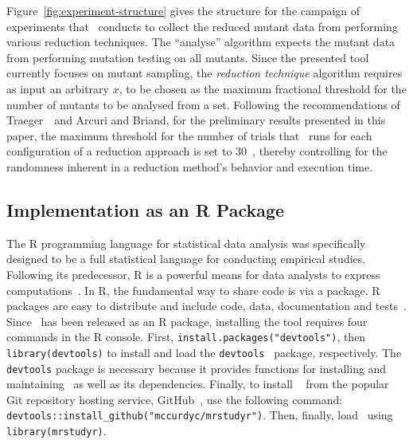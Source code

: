 Figure~\ref{fig:experiment-structure} gives the structure for the campaign of experiments that \mr~conducts to collect
the reduced mutant data from performing various reduction techniques. The ``analyse'' algorithm expects the mutant data from performing
mutation testing on all mutants. Since the presented tool currently focuses on mutant
sampling, the \textit{reduction technique} algorithm requires as input an arbitrary $x$, to be chosen as the maximum fractional threshold for the
number of mutants to be analysed from a set. Following the recommendations of Traeger~\etal~and Arcuri and Briand,
for the preliminary results presented in this paper, the maximum threshold for the number of trials that \mr~runs for each configuration of a reduction approach is set to 30~\cite{traeger2008nine, arcuri2014hitchhiker}, thereby
controlling for the randomness inherent in a reduction method's behavior and execution time.

\subsection{Implementation as an R Package}

The R programming language for statistical data analysis was specifically designed to be a full statistical language for
conducting empirical studies. Following its predecessor, R is a powerful means for data analysts to express
computations~\cite{ihaka1996r}.  In R, the fundamental way to share code is via a package.  R packages are easy to
distribute and include code, data, documentation and tests~\cite{wickham2015r}.  Since \mr~has been released as an R
package, installing the tool requires four commands in the R console.  First, \texttt{install.packages("devtools")},
then {\small\texttt{library(devtools)}} to install and load the {\small\texttt{devtools}}~\cite{devtools} package,
respectively.  The \texttt{devtools} package is necessary because it provides functions for installing and maintaining
\mr~as well as its dependencies.  Finally, to install \mr~\cite{tool} from the popular Git repository hosting service,
GitHub~\cite{github}, use the following command: {\small\texttt{devtools::install\_github("mccurdyc/mrstudyr")}}.  Then,
finally, load \mr~using \texttt{library(mrstudyr)}.



